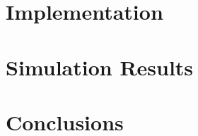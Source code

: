 \documentclass[12pt,twoside]{mitthesis}
\begin{document}
\part{Implementation}

\part{Simulation Results}

\part{Conclusions}


\begin{singlespace}


\end{singlespace}
\end{document}
